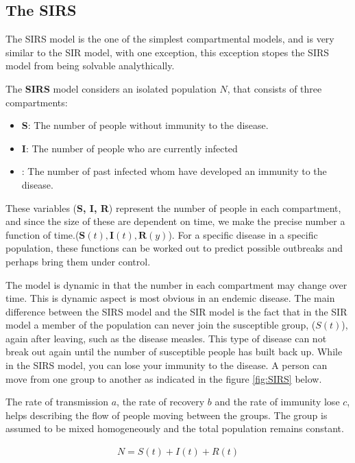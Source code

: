 \subsection{The SIRS}
The SIRS model is the one of the simplest compartmental models, and is very similar to the SIR model, with one exception, this exception stopes the SIRS model from being solvable analythically.

The \textbf{SIRS} model considers an isolated population $N$, that consists of three compartments:
\begin{itemize}
\item \textbf{S}: The number of people without immunity to the disease. 
\item \textbf{I}: The number of people who are currently infected
\item {}: The number of past infected whom have developed an immunity to the disease.
\end{itemize}\label{table:1}

These variables (\textbf{S, I, R}) represent the number of people in each compartment, and since the size of these are dependent on time, we make the precise number a function of time.($ \textbf{S}(t), \textbf{I}(t), \textbf{R}(y)$). For a specific disease in a specific population, these functions can be worked out to predict possible outbreaks and perhaps bring them under control. 

The model is dynamic in that the number in each compartment may change over time. This is dynamic aspect is most obvious in an endemic disease. The main difference between the SIRS model and the SIR model is the fact that in the SIR model a member of the population can never join the susceptible group, ($S(t)$), again after leaving, such as the disease measles. This type of disease can not break out again until the number of susceptible people has built back up. While in the SIRS model, you can lose your immunity to the disease. A person can move from one group to another as indicated in the figure \ref{fig:SIRS} below.

	The rate of transmission $a$, the rate of recovery $b$ and the rate of immunity lose $c$, helps describing the flow of people moving between the groups. The group is assumed to be mixed homogeneously and the total population remains constant.
	
\begin{align}
N = S(t) + I(t) + R(t) 
\end{align}
	
